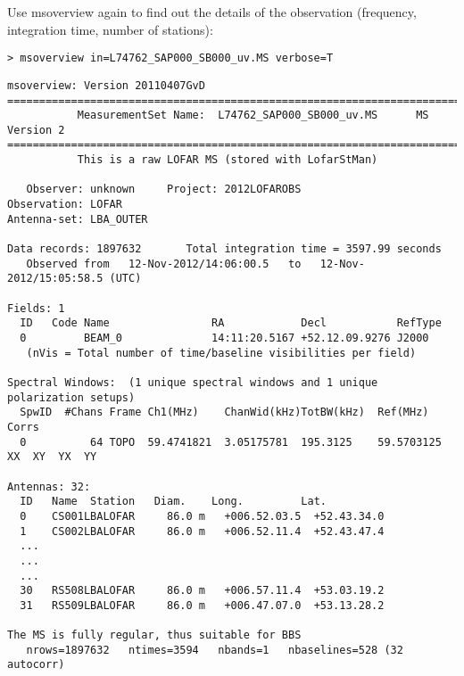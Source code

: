 Use msoverview again to find out the details of the observation (frequency, integration time, number of stations): 
\begin{verbatim}
> msoverview in=L74762_SAP000_SB000_uv.MS verbose=T
\end{verbatim}
\begin{lstlisting}
msoverview: Version 20110407GvD
================================================================================
           MeasurementSet Name:  L74762_SAP000_SB000_uv.MS      MS Version 2
================================================================================
           This is a raw LOFAR MS (stored with LofarStMan)

   Observer: unknown     Project: 2012LOFAROBS  
Observation: LOFAR
Antenna-set: LBA_OUTER

Data records: 1897632       Total integration time = 3597.99 seconds
   Observed from   12-Nov-2012/14:06:00.5   to   12-Nov-2012/15:05:58.5 (UTC)

Fields: 1
  ID   Code Name                RA            Decl           RefType 
  0         BEAM_0              14:11:20.5167 +52.12.09.9276 J2000   
   (nVis = Total number of time/baseline visibilities per field) 

Spectral Windows:  (1 unique spectral windows and 1 unique polarization setups)
  SpwID  #Chans Frame Ch1(MHz)    ChanWid(kHz)TotBW(kHz)  Ref(MHz)    Corrs           
  0          64 TOPO  59.4741821  3.05175781  195.3125    59.5703125  XX  XY  YX  YY  

Antennas: 32:
  ID   Name  Station   Diam.    Long.         Lat.         
  0    CS001LBALOFAR     86.0 m   +006.52.03.5  +52.43.34.0  
  1    CS002LBALOFAR     86.0 m   +006.52.11.4  +52.43.47.4 
  ...
  ...
  ... 
  30   RS508LBALOFAR     86.0 m   +006.57.11.4  +53.03.19.2  
  31   RS509LBALOFAR     86.0 m   +006.47.07.0  +53.13.28.2  

The MS is fully regular, thus suitable for BBS
   nrows=1897632   ntimes=3594   nbands=1   nbaselines=528 (32 autocorr)
\end{lstlisting}
